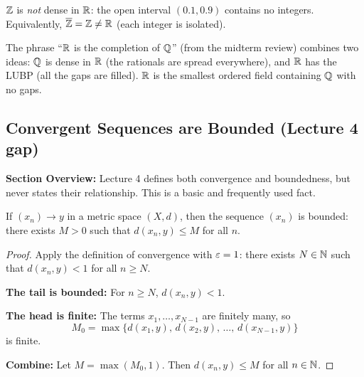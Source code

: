 \documentclass[../master/master.tex]{subfiles}
\begin{document}
\begin{example}
$\mathbb{Z}$ is \emph{not} dense in $\mathbb{R}$: the open interval $(0.1, 0.9)$ contains no integers. Equivalently, $\overline{\mathbb{Z}} = \mathbb{Z} \neq \mathbb{R}$ (each integer is isolated).
\end{example}

\begin{remark}
The phrase ``$\mathbb{R}$ is the completion of $\mathbb{Q}$'' (from the midterm review) combines two ideas: $\mathbb{Q}$ is dense in $\mathbb{R}$ (the rationals are spread everywhere), and $\mathbb{R}$ has the LUBP (all the gaps are filled). $\mathbb{R}$ is the smallest ordered field containing $\mathbb{Q}$ with no gaps.
\end{remark}

\newpage
\subsection{Convergent Sequences are Bounded (Lecture 4 gap)}

\begin{summarybox}
\textbf{Section Overview:} Lecture 4 defines both convergence and boundedness, but never states their relationship. This is a basic and frequently used fact.
\end{summarybox}

\begin{theorem}
If $(x_n) \to y$ in a metric space $(X, d)$, then the sequence $(x_n)$ is bounded: there exists $M > 0$ such that $d(x_n, y) \leq M$ for all $n$.
\end{theorem}

\begin{proof}
Apply the definition of convergence with $\varepsilon = 1$: there exists $N \in \mathbb{N}$ such that $d(x_n, y) < 1$ for all $n \geq N$.

\textbf{The tail is bounded:} For $n \geq N$, $d(x_n, y) < 1$.

\textbf{The head is finite:} The terms $x_1, \ldots, x_{N-1}$ are finitely many, so
\[
    M_0 = \max\{d(x_1, y), \, d(x_2, y), \, \ldots, \, d(x_{N-1}, y)\}
\]
is finite.

\textbf{Combine:} Let $M = \max(M_0, 1)$. Then $d(x_n, y) \leq M$ for all $n \in \mathbb{N}$.
\end{proof}
\end{document}
